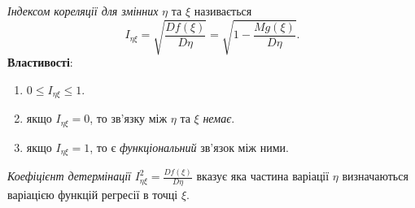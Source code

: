 \textit{Індексом кореляції для змінних} $\eta$ та $\xi$ називається \[I_{\eta\xi} = \sqrt{\dfrac{Df(\xi)}{D\eta}} = \sqrt{1 - \dfrac{Mg(\xi)}{D\eta}}. \]
\textbf{Властивості}:
\begin{enumerate}
	\item $0 \le I_{\eta\xi} \le 1$.
	\item якщо $I_{\eta\xi} = 0$, то зв'язку між $\eta$ та $\xi$ \textit{немає}.
	\item якщо $I_{\eta\xi} = 1$, то є \textit{функціональний} зв'язок між ними.
\end{enumerate}
\textit{Коефіцієнт детермінації} $I_{\eta\xi}^2 = \frac{Df(\xi)}{D\eta}$ вказує яка частина варіації $\eta$ визначаються варіацією функцій регресії в точці $\xi$.